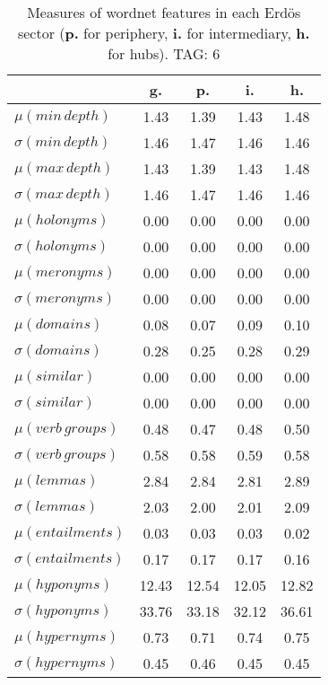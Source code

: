 \begin{table}[h!]
\begin{center}
\begin{tabular}{| l || c | c | c | c |}\hline
 & {\bf g.} & {\bf p.} & {\bf i.} & {\bf h.} \\\hline\hline
$\mu(min\,depth)$ & 1.43  & 1.39  & 1.43  & 1.48 \\
$\sigma(min\,depth)$ & 1.46  & 1.47  & 1.46  & 1.46 \\\hline
$\mu(max\,depth)$ & 1.43  & 1.39  & 1.43  & 1.48 \\
$\sigma(max\,depth)$ & 1.46  & 1.47  & 1.46  & 1.46 \\\hline
$\mu(holonyms)$ & 0.00  & 0.00  & 0.00  & 0.00 \\
$\sigma(holonyms)$ & 0.00  & 0.00  & 0.00  & 0.00 \\\hline
$\mu(meronyms)$ & 0.00  & 0.00  & 0.00  & 0.00 \\
$\sigma(meronyms)$ & 0.00  & 0.00  & 0.00  & 0.00 \\\hline
$\mu(domains)$ & 0.08  & 0.07  & 0.09  & 0.10 \\
$\sigma(domains)$ & 0.28  & 0.25  & 0.28  & 0.29 \\\hline
$\mu(similar)$ & 0.00  & 0.00  & 0.00  & 0.00 \\
$\sigma(similar)$ & 0.00  & 0.00  & 0.00  & 0.00 \\\hline
$\mu(verb\,groups)$ & 0.48  & 0.47  & 0.48  & 0.50 \\
$\sigma(verb\,groups)$ & 0.58  & 0.58  & 0.59  & 0.58 \\\hline
$\mu(lemmas)$ & 2.84  & 2.84  & 2.81  & 2.89 \\
$\sigma(lemmas)$ & 2.03  & 2.00  & 2.01  & 2.09 \\\hline
$\mu(entailments)$ & 0.03  & 0.03  & 0.03  & 0.02 \\
$\sigma(entailments)$ & 0.17  & 0.17  & 0.17  & 0.16 \\\hline
$\mu(hyponyms)$ & 12.43  & 12.54  & 12.05  & 12.82 \\
$\sigma(hyponyms)$ & 33.76  & 33.18  & 32.12  & 36.61 \\\hline
$\mu(hypernyms)$ & 0.73  & 0.71  & 0.74  & 0.75 \\
$\sigma(hypernyms)$ & 0.45  & 0.46  & 0.45  & 0.45 \\\hline
\end{tabular}
\caption{Measures of wordnet features in each Erd\"os sector ({{\bf p.}} for periphery, {{\bf i.}} for intermediary, {{\bf h.}} for hubs). TAG: 6}
\end{center}
\end{table}